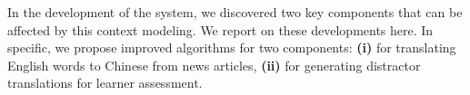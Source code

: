In the development of the system, we discovered two key components
that can be affected by this context modeling.  We report on these
developments here.  In specific, we propose improved algorithms for
two components: \textbf{(i)} for translating English words to Chinese
from news articles, \textbf{(ii)} for generating distractor
translations for learner assessment.


